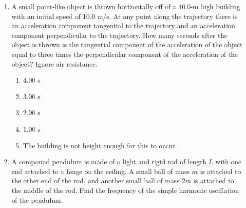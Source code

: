\documentclass[12pt,letterpaper]{article}
\begin{document}
\begin{enumerate}
\item
A small point-like object is thrown horizontally off of a 40.0-m high building with an initial speed of 10.0 m/s. At any point along the trajectory there is an acceleration component tangential to the trajectory and an acceleration component perpendicular to the trajectory. How many seconds after the object is thrown is the tangential component of the acceleration of the object equal to three times the perpendicular component of the acceleration of the object? Ignore air resistance.
\begin{enumerate}
\item 4.00 s
\item 3.00 s
\item 2.00 s
\item 1.00 s
\item The building is not height enough for this to occur.
\end{enumerate}

\item
A compound pendulum is made of a light and rigid rod of length $L$ with one end attached to a hinge on the ceiling. A small ball of mass $m$ is attached to the other end of the rod, and another small ball of mass $2m$ is attached to the middle of the rod. Find the frequency of the simple harmonic oscillation of the pendulum.

\begin{tabular}{l r}


\end{tabular}
\end{enumerate}
\end{document}
